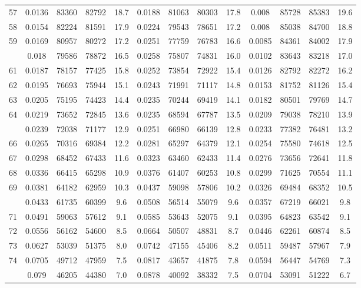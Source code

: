 \documentclass[
  14pt,
]{article}
\begin{document}
\begin{longtable}[t]{lcccccccccccc}
57 & 0.0136 & 83360 & 82792 & 18.7 & 0.0188 & 81063 & 80303 & 17.8 & 0.008 & 85728 & 85383 & 19.6\\
58 & 0.0154 & 82224 & 81591 & 17.9 & 0.0224 & 79543 & 78651 & 17.2 & 0.008 & 85038 & 84700 & 18.8\\
59 & 0.0169 & 80957 & 80272 & 17.2 & 0.0251 & 77759 & 76783 & 16.6 & 0.0085 & 84361 & 84002 & 17.9\\
\addlinespace
60 & 0.018 & 79586 & 78872 & 16.5 & 0.0258 & 75807 & 74831 & 16.0 & 0.0102 & 83643 & 83218 & 17.0\\
61 & 0.0187 & 78157 & 77425 & 15.8 & 0.0252 & 73854 & 72922 & 15.4 & 0.0126 & 82792 & 82272 & 16.2\\
62 & 0.0195 & 76693 & 75944 & 15.1 & 0.0243 & 71991 & 71117 & 14.8 & 0.0153 & 81752 & 81126 & 15.4\\
63 & 0.0205 & 75195 & 74423 & 14.4 & 0.0235 & 70244 & 69419 & 14.1 & 0.0182 & 80501 & 79769 & 14.7\\
64 & 0.0219 & 73652 & 72845 & 13.6 & 0.0235 & 68594 & 67787 & 13.5 & 0.0209 & 79038 & 78210 & 13.9\\
\addlinespace
65 & 0.0239 & 72038 & 71177 & 12.9 & 0.0251 & 66980 & 66139 & 12.8 & 0.0233 & 77382 & 76481 & 13.2\\
66 & 0.0265 & 70316 & 69384 & 12.2 & 0.0281 & 65297 & 64379 & 12.1 & 0.0254 & 75580 & 74618 & 12.5\\
67 & 0.0298 & 68452 & 67433 & 11.6 & 0.0323 & 63460 & 62433 & 11.4 & 0.0276 & 73656 & 72641 & 11.8\\
68 & 0.0336 & 66415 & 65298 & 10.9 & 0.0376 & 61407 & 60253 & 10.8 & 0.0299 & 71625 & 70554 & 11.1\\
69 & 0.0381 & 64182 & 62959 & 10.3 & 0.0437 & 59098 & 57806 & 10.2 & 0.0326 & 69484 & 68352 & 10.5\\
\addlinespace
70 & 0.0433 & 61735 & 60399 & 9.6 & 0.0508 & 56514 & 55079 & 9.6 & 0.0357 & 67219 & 66021 & 9.8\\
71 & 0.0491 & 59063 & 57612 & 9.1 & 0.0585 & 53643 & 52075 & 9.1 & 0.0395 & 64823 & 63542 & 9.1\\
72 & 0.0556 & 56162 & 54600 & 8.5 & 0.0664 & 50507 & 48831 & 8.7 & 0.0446 & 62261 & 60874 & 8.5\\
73 & 0.0627 & 53039 & 51375 & 8.0 & 0.0742 & 47155 & 45406 & 8.2 & 0.0511 & 59487 & 57967 & 7.9\\
74 & 0.0705 & 49712 & 47959 & 7.5 & 0.0817 & 43657 & 41875 & 7.8 & 0.0594 & 56447 & 54769 & 7.3\\
\addlinespace
75 & 0.079 & 46205 & 44380 & 7.0 & 0.0878 & 40092 & 38332 & 7.5 & 0.0704 & 53091 & 51222 & 6.7\\

\end{longtable}
\end{document}
